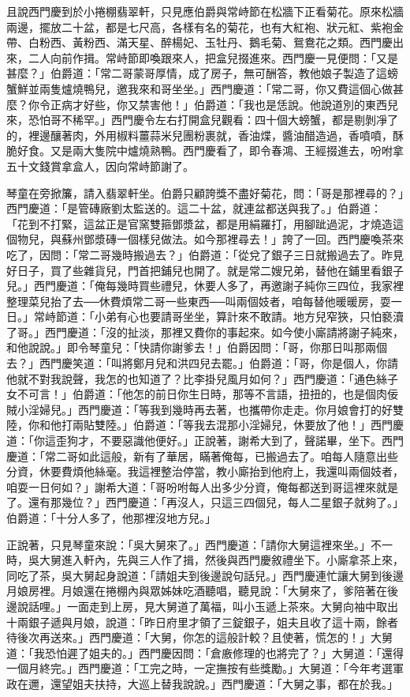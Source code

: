 且說西門慶到於小捲棚翡翠軒，只見應伯爵與常峙節在松牆下正看菊花。原來松牆兩邊，擺放二十盆，都是七尺高，各樣有名的菊花，也有大紅袍、狀元紅、紫袍金帶、白粉西、黃粉西、滿天星、醉楊妃、玉牡丹、鵝毛菊、鴛鴦花之類。西門慶出來，二人向前作揖。常峙節即喚跟來人，把盒兒掇進來。西門慶一見便問：「又是甚麼？」伯爵道：「常二哥蒙哥厚情，成了房子，無可酬答，教他娘子製造了這螃蟹鮮並兩隻爐燒鴨兒，邀我來和哥坐坐。」西門慶道：「常二哥，你又費這個心做甚麼？你令正病才好些，你又禁害他！」伯爵道：「我也是恁說。他說道別的東西兒來，恐怕哥不稀罕。」西門慶令左右打開盒兒觀看：四十個大螃蟹，都是剔剝凈了的，裡邊釀著肉，外用椒料薑蒜米兒團粉裹就，香油煠，醬油醋造過，香噴噴，酥脆好食。又是兩大隻院中爐燒熟鴨。西門慶看了，即令春鴻、王經掇進去，吩咐拿五十文錢賞拿盒人，因向常峙節謝了。

琴童在旁掀簾，請入翡翠軒坐。伯爵只顧誇獎不盡好菊花，問：「哥是那裡尋的？」西門慶道：「是管磚廠劉太監送的。這二十盆，就連盆都送與我了。」伯爵道： 「花到不打緊，這盆正是官窯雙箍鄧漿盆，都是用絹羅打，用腳跐過泥，才燒造這個物兒，與蘇州鄧漿磚一個樣兒做法。如今那裡尋去！」誇了一回。西門慶喚茶來吃了，因問：「常二哥幾時搬過去？」伯爵道：「從兌了銀子三日就搬過去了。昨見好日子，買了些雜貨兒，門首把鋪兒也開了。就是常二嫂兄弟，替他在鋪里看銀子兒。」西門慶道：「俺每幾時買些禮兒，休要人多了，再邀謝子純你三四位，我家裡整理菜兒抬了去──休費煩常二哥一些東西──叫兩個妓者，咱每替他暖暖房，耍一日。」常峙節道：「小弟有心也要請哥坐坐，算計來不敢請。地方兒窄狹，只怕褻瀆了哥。」西門慶道：「沒的扯淡，那裡又費你的事起來。如今使小廝請將謝子純來，和他說說。」即令琴童兒：「快請你謝爹去！」伯爵因問：「哥，你那日叫那兩個去？」西門慶笑道：「叫將鄭月兒和洪四兒去罷。」伯爵道：「哥，你是個人，你請他就不對我說聲，我怎的也知道了？比李掛兒風月如何？」西門慶道：「通色絲子女不可言！」伯爵道：「他怎的前日你生日時，那等不言語，扭扭的，也是個肉佞賊小淫婦兒。」西門慶道：「等我到幾時再去著，也攜帶你走走。你月娘會打的好雙陸，你和他打兩貼雙陸。」伯爵道：「等我去混那小淫婦兒，休要放了他！」西門慶道：「你這歪狗才，不要惡識他便好。」正說著，謝希大到了，聲諾畢，坐下。西門慶道：「常二哥如此這般，新有了華居，瞞著俺每，已搬過去了。咱每人隨意出些分資，休要費煩他絲毫。我這裡整治停當，教小廝抬到他府上，我還叫兩個妓者，咱耍一日何如？」謝希大道：「哥吩咐每人出多少分資，俺每都送到哥這裡來就是了。還有那幾位？」西門慶道：「再沒人，只這三四個兒，每人二星銀子就夠了。」伯爵道：「十分人多了，他那裡沒地方兒。」

正說著，只見琴童來說：「吳大舅來了。」西門慶道：「請你大舅這裡來坐。」不一時，吳大舅進入軒內，先與三人作了揖，然後與西門慶敘禮坐下。小廝拿茶上來，同吃了茶，吳大舅起身說道：「請姐夫到後邊說句話兒。」西門慶連忙讓大舅到後邊月娘房裡。月娘還在捲棚內與眾姊妹吃酒聽唱，聽見說：「大舅來了，爹陪著在後邊說話哩。」一面走到上房，見大舅道了萬福，叫小玉遞上茶來。大舅向袖中取出十兩銀子遞與月娘，說道：「昨日府里才領了三錠銀子，姐夫且收了這十兩，餘者待後次再送來。」西門慶道：「大舅，你怎的這般計較？且使著，慌怎的！」大舅道：「我恐怕遲了姐夫的。」西門慶因問：「倉廒修理的也將完了？」大舅道：「還得一個月終完。」西門慶道：「工完之時，一定撫按有些獎勵。」大舅道：「今年考選軍政在邇，還望姐夫扶持，大巡上替我說說。」西門慶道：「大舅之事，都在於我。」

